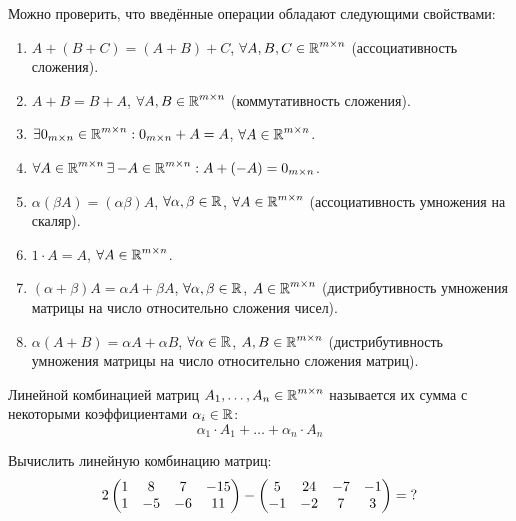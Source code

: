 \documentclass[a4paper,12pt]{article}
\begin{document}
  \begin{remark}
    Можно проверить, что введённые операции обладают следующими свойствами:
    \begin{enumerate}
      \item $A + (B + C) = (A + B) + C$, $\forall A, B, C \in \operatorname{\mathbb R}^{m \times n}$ (ассоциативность сложения).
      \item $A + B = B + A$, $\forall A, B \in \operatorname{\mathbb R}^{m \times n}$ (коммутативность сложения).
      \item $\exists 0_{m\times n} \in \operatorname{\mathbb R}^{m \times n}: 0_{m\times n} + A = A$, $\forall A \hm\in \RR^{m \times n}$.
      \item $\forall A \in \operatorname{\mathbb R}^{m \times n} \exists\, {-A} \in \operatorname{\mathbb R}^{m \times n}: A + ({-A}) = 0_{m\times n}$.
      \item $\alpha (\beta A) = (\alpha \beta) A$, $\forall \alpha, \beta \in \operatorname{\mathbb R}$, $\forall A \hm\in \RR^{m \times n}$ (ассоциативность умножения на скаляр).
      \item $1 \cdot A = A$, $\forall A \in \operatorname{\mathbb R}^{m \times n}$.
      \item $(\alpha + \beta) A = \alpha A + \beta A$, $\forall \alpha, \beta \hm\in \RR$, $A \hm\in \RR^{m \times n}$ (дистрибутивность умножения матрицы на число относительно сложения чисел).
      \item $\alpha (A + B) = \alpha A + \alpha B$, $\forall \alpha \hm\in \RR$, $A, B \hm\in \RR^{m \times n}$ (дистрибутивность умножения матрицы на число относительно сложения матриц).
    \end{enumerate}
  \end{remark}
  
  \begin{definition}
    Линейной комбинацией матриц $A_1, \ldots, A_n \hm\in \RR^{m \times n}$ называется их сумма с некоторыми коэффициентами $\alpha_i \hm\in \RR$:
    \[
      \alpha_1 \cdot A_1 + \ldots + \alpha_n \cdot A_n
    \]
  \end{definition}
  
  
  \begin{problem}[15.2(3)]
    Вычислить линейную комбинацию матриц:
    \[
      2 \begin{pmatrix}
        1 & 8 & 7 & -15\\
        1 & -5 & -6 & 11
      \end{pmatrix}
      - \begin{pmatrix}
        5 & 24 & -7 & -1\\
        -1 & -2 & 7 & 3
      \end{pmatrix} = \operatorname{?}
    \]
  \end{problem}
  
\end{document}
